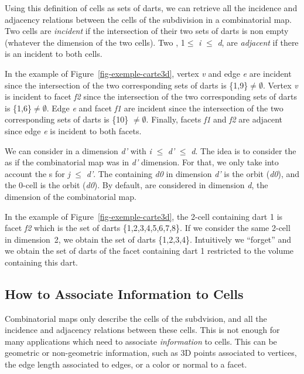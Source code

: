 Using this definition of cells as sets of darts, we can retrieve all the
incidence and adjacency relations between the cells of the subdivision
in a combinatorial map.  Two cells are \emph{incident} if the
intersection of their two sets of darts is non empty (whatever the
dimension of the two cells). Two , 1$\leq$ \emph{i} $\leq$ \emph{d}, are
\emph{adjacent} if there is an  incident to both cells.

In the example of Figure~\ref{fig-exemple-carte3d}, vertex \emph{v} and
edge \emph{e} are incident since the intersection of the two corresponding
sets of darts is \{1,9\}$\neq \emptyset$. Vertex \emph{v} is incident to facet
\emph{f2} since the intersection of the two corresponding sets of darts is
\{1,6\}$\neq \emptyset$. Edge \emph{e} and facet \emph{f1} are incident
since the intersection of the two corresponding sets of darts is
\{10\} $\neq \emptyset$. Finally, facets \emph{f1} and \emph{f2} are adjacent
since edge \emph{e} is incident to both facets.

We can consider  in a dimension \emph{d'} with  \emph{i} $\leq$ \emph{d'} $\leq$
\emph{d}. The idea is to consider the  as if the combinatorial map
was in \emph{d'} dimension. For that, we only take into account the
\betaj{}s for \emph{j} $\leq$ \emph{d'}.  The  containing \emph{d0} in dimension
\emph{d'} is the orbit
\orbit{\betaun{},$\ldots$,\betaimun{},\betaipun{},$\ldots$,\betadprim{}}(\emph{d0}), and 
the 0-cell is the orbit (\emph{d0}).  By default,  are considered in
dimension \emph{d}, the dimension of the combinatorial map.

In the example of Figure~\ref{fig-exemple-carte3d}, the 2-cell
containing dart 1 is facet \emph{f2} which is the set of darts
\{1,2,3,4,5,6,7,8\}. If we consider the same 2-cell in dimension~2,
we obtain the set of darts \{1,2,3,4\}. Intuitively we ``forget''
\betatrois{} and we obtain the set of darts of the facet containing dart
1 restricted to the volume containing this dart.

\subsection{How to Associate Information to Cells}
\label{ssec-associate-attributes}
Combinatorial maps only describe the cells of the subdvision, and all
the incidence and adjacency relations between these cells. This is not
enough for many applications which need to associate
\emph{information} to cells.  This can be geometric or non-geometric
information, such as 3D points associated to vertices, the edge length
associated to edges, or a color or normal to a facet.

